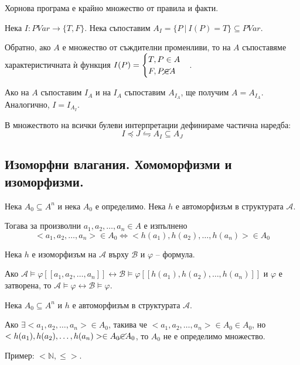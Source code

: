 \documentclass{article}
\begin{document}
\begin{mydef}
Хорнова програма е крайно множество от правила и факти.
\end{mydef}

\begin{mydef}
Нека $I : PVar \longrightarrow \{T, F\}$. Нека съпоставим $A_I = \{P\ |\ I(P) = T\} \subseteq PVar$. 

Обратно, ако $A$ е множество от съждителни променливи, то на $A$ съпоставяме характеристичната ѝ функция $I(P) = \begin{cases}
T, P \in A \\
F, P \cancel{\in} A
\end{cases}
$.

Ако на $A$ съпоставим $I_A$ и на $I_A$ съпоставим $A_{I_A}$, ще получим $A = A_{I_A}$. Аналогично, $I = I_{A_I}$.

В множеството на всички булеви интерпретации дефинираме частична наредба: \[I \preccurlyeq J \leftrightharpoons A_I \subseteq A_J\]
\end{mydef}

\subsection*{Изоморфни влагания. Хомоморфизми и изоморфизми.}

\begin{mydef}
Нека $A_0 \subseteq A^n$ и нека $A_0$ е определимо. Нека $h$ е автоморфизъм в структурата $\mathcal{A}$. 

Тогава за произволни $a_1, a_2, \ldots, a_n \in A$ е изпълнено \[<a_1, a_2, \ldots, a_n> \in A_0 \Leftrightarrow <h(a_1), h(a_2), \ldots, h(a_n)> \in A_0\]
\end{mydef}

\begin{mydef}
Нека $h$ е изоморфизъм на $\mathcal{A}$ върху $\mathcal{B}$ и $\varphi$ -- формула.

Ако $\mathcal{A} \models \varphi[\![a_1, a_2, \ldots, a_n]\!] \longleftrightarrow \mathcal{B} \models \varphi[\![h(a_1), h(a_2), \ldots, h(a_n)]\!]$ и $\varphi$ е затворена, то $\mathcal{A} \models \varphi \longleftrightarrow \mathcal{B} \models \varphi$.
\end{mydef}

\begin{mydef}
Нека $A_0 \subseteq A^n$ и $h$ е автоморфизъм в структурата $\mathcal{A}$.

Ако $\exists <a_1, a_2, \ldots, a_n> \in A_0$, такива че $<a_1, a_2, \ldots, a_n> \in A_0 \in A_0$, но $<h(a_1), h(a_2), \ldots, h(a_n)> \in A_0 \cancel{\in} A_0$, то $A_0$ не е определимо множество.

Пример: $<\mathbb{N}, \leq>$.
\end{mydef}
\end{document}

